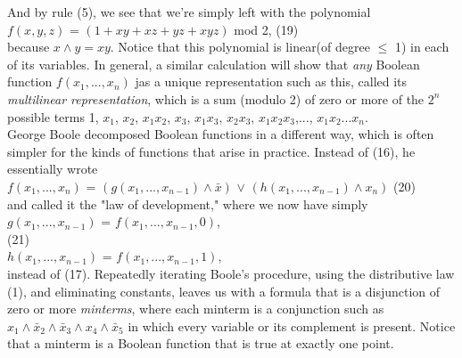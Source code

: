 \documentclass{article}
\begin{document}
And by rule (5), we see that we're simply left with the polynomial \vspace{0.3cm} \\
 \indent \hspace{1.5cm}
 $f(x, y, z)$ = $(1 + xy + xz + yz + xyz)$ mod 2, 
 \hspace{4cm} (19) \vspace{0.08cm} \\ 
 because $x \wedge y = xy$. Notice that this polynomial is linear(of degree $\leq$ 1) in each of its variables. In general, a similar calculation will show that \emph{any}
 Boolean function $f(x_1, ..., x_n)$ jas a unique representation such as this, called its \emph{multilinear representation}, which is a sum (modulo 2) of zero or more of the $2^n$ possible terms 1, $x_1$, $x_2$, $x_1x_2$, $x_3$, $x_1x_3$, $x_2x_3$, $x_1x_2x_3$,$...$, $x_1x_2...x_n$. \\
 \indent
 George Boole decomposed Boolean functions in a different way, which is often simpler for the kinds of functions that arise in practice. Instead of (16), he essentially wrote \vspace{0.3cm} \\ \indent
 $f(x_1, ..., x_n)$ = $(g(x_1, ..., x_{n-1}) \wedge \bar{x})$ $\vee$ $(h(x_1, ..., x_{n-1}) \wedge x_n)$
 \hspace{3cm} (20) \vspace{0.08cm} \\ 
 and called it the "law of development," where we now have simply
 \vspace{0.3cm} \\ \indent
 \hspace{2cm} 
 $g(x_1, ..., x_{n-1})$ = $f(x_1, ..., x_{n-1}, 0)$, \vspace{0.1mm}
 \\ \indent \hspace{11.9cm}  (21)
 \\ \indent
 \hspace{2cm}
 $h(x_1, ..., x_{n-1})$ = $f(x_1, ..., x_{n-1}, 1)$, 
 \vspace{0.3cm} \\
 instead of (17). Repeatedly iterating Boole's procedure, using the distributive law (1), and eliminating constants, leaves us with a formula that is a disjunction of zero or more \emph{minterms}, where each minterm is a conjunction such as 
 $x_1 \wedge \bar{x}_2 \wedge \bar{x}_3 \wedge x_4 \wedge \bar{x}_5$ in which every variable or its complement is present. Notice that a minterm is a Boolean function that is true at exactly one point. \\ \indent
\end{document}
